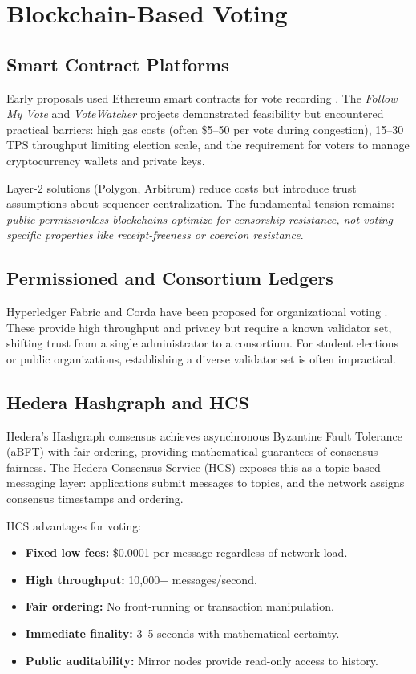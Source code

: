 \section{Blockchain-Based Voting}
\label{sec:blockchain-voting}

\subsection{Smart Contract Platforms}
Early proposals used Ethereum smart contracts for vote recording \cite{mcmurray2018blockchain}.
The \textit{Follow My Vote} and \textit{VoteWatcher} projects demonstrated feasibility
but encountered practical barriers: high gas costs (often \$5--50 per vote during
congestion), 15--30 TPS throughput limiting election scale, and the requirement for
voters to manage cryptocurrency wallets and private keys.

Layer-2 solutions (Polygon, Arbitrum) reduce costs but introduce trust assumptions
about sequencer centralization. The fundamental tension remains: \textit{public
permissionless blockchains optimize for censorship resistance, not voting-specific
properties like receipt-freeness or coercion resistance}.

\subsection{Permissioned and Consortium Ledgers}
Hyperledger Fabric \cite{androulaki2018hyperledger} and Corda have been proposed
for organizational voting \cite{kumar2019blockchain}. These provide high throughput
and privacy but require a known validator set, shifting trust from a single
administrator to a consortium. For student elections or public organizations,
establishing a diverse validator set is often impractical.

\subsection{Hedera Hashgraph and HCS}
Hedera's Hashgraph consensus \cite{baird2016hashgraph} achieves asynchronous
Byzantine Fault Tolerance (aBFT) with fair ordering, providing mathematical
guarantees of consensus fairness. The Hedera Consensus Service (HCS) \cite{hedera2020hcs}
exposes this as a topic-based messaging layer: applications submit messages to
topics, and the network assigns consensus timestamps and ordering.

HCS advantages for voting:
\begin{itemize}
    \item \textbf{Fixed low fees:} \$0.0001 per message regardless of network load.
    \item \textbf{High throughput:} 10,000+ messages/second.
    \item \textbf{Fair ordering:} No front-running or transaction manipulation.
    \item \textbf{Immediate finality:} 3--5 seconds with mathematical certainty.
    \item \textbf{Public auditability:} Mirror nodes provide read-only access to history.
\end{itemize}

